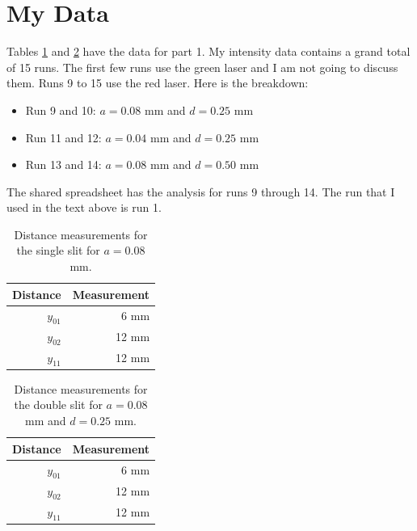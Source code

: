 \section{My Data}
Tables \ref{part1.single} and \ref{part1.double} have the data for part 1. My intensity data contains a grand total of 15 runs. The first few runs use the green laser and I am not going to discuss them. Runs 9 to 15 use the red laser. Here is the breakdown:
\begin{itemize}
	\item Run 9 and 10: $a = 0.08$ mm and $d = 0.25$ mm
	\item Run 11 and 12: $a = 0.04$ mm and $d = 0.25$ mm
	\item Run 13 and 14: $a = 0.08$ mm and $d = 0.50$ mm
\end{itemize}
The shared spreadsheet has the analysis for runs 9 through 14. The run that I used in the text above is run 1.
\begin{table}[ht!]
	\centering
	\begin{tabular}{|r|r|} \hline
		Distance & Measurement \\
		\hline
		$y_{01}$ & 6 mm \\
		$y_{02}$ & 12 mm \\
		$y_{11}$ & 12 mm \\
		\hline
	\end{tabular}
	\caption{Distance measurements for the single slit for $a = 0.08$ mm.}
	\label{part1.single}
\end{table}
\begin{table}[ht!]
	\centering
	\begin{tabular}{|r|r|} \hline
		Distance & Measurement \\
		\hline
		$y_{01}$ & 6 mm \\
		$y_{02}$ & 12 mm \\
		$y_{11}$ & 12 mm \\
		\hline
	\end{tabular}
	\caption{Distance measurements for the double slit for $a = 0.08$ mm and $d = 0.25$ mm.}
	\label{part1.double}
\end{table}
